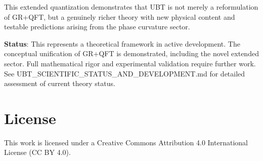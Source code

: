 \documentclass[12pt]{article}
\begin{document}
This extended quantization demonstrates that UBT is not merely a reformulation of GR+QFT, but a genuinely richer theory with new physical content and testable predictions arising from the phase curvature sector.

\vspace{2em}

\noindent\textbf{Status}: This represents a theoretical framework in active development. The conceptual unification of GR+QFT is demonstrated, including the novel extended sector. Full mathematical rigor and experimental validation require further work. See UBT\_SCIENTIFIC\_STATUS\_AND\_DEVELOPMENT.md for detailed assessment of current theory status.

\section*{License}
This work is licensed under a Creative Commons Attribution 4.0 International License (CC BY 4.0).
\end{document}
